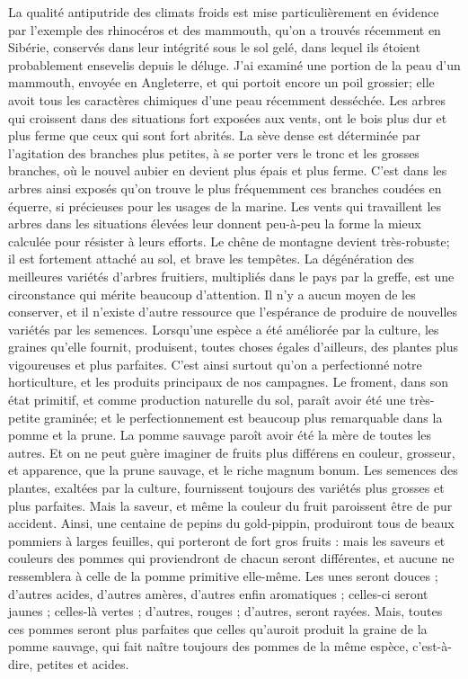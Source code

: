 La qualité antiputride des climats froids est mise particulièrement en évidence par l'exemple des rhinocéros et des mammouth, qu'on a trouvés récemment en Sibérie, conservés dans leur intégrité sous le sol gelé, dans lequel ils étoient probablement ensevelis depuis le déluge. J'ai examiné une portion de la peau d'un mammouth, envoyée en Angleterre, et qui portoit encore un poil grossier; elle avoit tous les caractères chimiques d'une peau récemment desséchée.
Les arbres qui croissent dans des situations fort exposées aux vents, ont le bois plus dur et plus ferme que ceux qui sont fort abrités. La sève dense est déterminée par l'agitation des branches plus petites, à se porter vers le tronc et les grosses branches,\setcounter{page}{125} où le nouvel aubier en devient plus épais et plus ferme. C'est dans les arbres ainsi exposés qu'on trouve le plus fréquemment ces branches coudées en équerre, si précieuses pour les usages de la marine. Les vents qui travaillent les arbres dans les situations élevées leur donnent peu-à-peu la forme la mieux calculée pour résister à leurs efforts. Le chêne de montagne devient très-robuste; il est fortement attaché au sol, et brave les tempêtes.
La dégénération des meilleures variétés d'arbres fruitiers, multipliés dans le pays par la greffe, est une circonstance qui mérite beaucoup d'attention. Il n'y a aucun moyen de les conserver, et il n'existe d'autre ressource que l'espérance de produire de nouvelles variétés par les semences.
Lorsqu'une espèce a été améliorée par la culture, les graines qu'elle fournit, produisent, toutes choses égales d'ailleurs, des plantes plus vigoureuses et plus parfaites. C'est ainsi surtout qu'on a perfectionné notre horticulture, et les produits principaux de nos campagnes.
Le froment, dans son état primitif, et comme production naturelle du sol, paraît avoir été une très-petite graminée; et le\setcounter{page}{126} perfectionnement est beaucoup plus remarquable dans la pomme et la prune. La pomme sauvage paroît avoir été la mère de toutes les autres. Et on ne peut guère imaginer de fruits plus différens en couleur, grosseur, et apparence, que la prune sauvage, et le riche magnum bonum.
Les semences des plantes, exaltées par la culture, fournissent toujours des variétés plus grosses et plus parfaites. Mais la saveur, et même la couleur du fruit paroissent être de pur accident. Ainsi, une centaine de pepins du gold-pippin, produiront tous de beaux pommiers à larges feuilles, qui porteront de fort gros fruits : mais les saveurs et couleurs des pommes qui proviendront de chacun seront différentes, et aucune ne ressemblera à celle de la pomme primitive elle-même. Les unes seront douces ; d'autres acides, d'autres amères, d'autres enfin aromatiques ; celles-ci seront jaunes ; celles-là vertes ; d'autres, rouges ; d'autres, seront rayées. Mais, toutes ces pommes seront plus parfaites que celles qu'auroit produit la graine de la pomme sauvage, qui fait naître toujours des pommes de la même espèce, c'est-à-dire, petites et acides.
